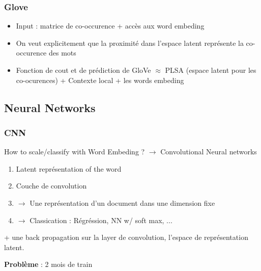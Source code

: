 \documentclass{article}
\theoremstyle{plain}%
\theoremstyle{definition}
\theoremstyle{remark}
\begin{document}
\subsubsection{Glove}
\begin{itemize}
    \item Input : matrice de co-occurence + accès aux word embeding
    \item On veut explicitement que la proximité dans l'espace latent représente la co-occurence des mots
    \item Fonction de cout et de prédiction de GloVe $ \approx  $ PLSA (espace latent pour les co-ocurences) + Contexte local + les words embeding 
\end{itemize}

\subsection{Neural Networks}
\subsubsection{CNN}
How to scale/classify with Word Embeding ? $\rightarrow$ Convolutional Neural networks
\begin{enumerate}
    \item Latent représentation of the word 
    \item Couche de convolution
    \item $\rightarrow$ Une représentation d'un document dans une dimension fixe
    \item $\rightarrow$ Classication : Régréssion, NN w/ soft max, ...
\end{enumerate}
+ une back propagation sur la layer de convolution, l'espace de représentation latent. 

\textbf{Problème} : 2 mois de train 
\end{document}
